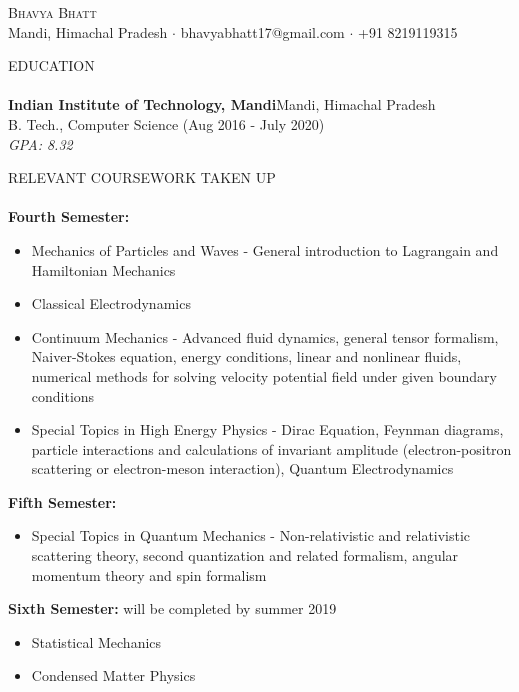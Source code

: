 \documentclass[a4paper]{article}
\newcommand{\lineunder} {
    \vspace*{-8pt} \\
    \hspace*{-18pt} \hrulefill \\
}
\newcommand{\header} [1] {
    {\hspace*{-18pt}\vspace*{6pt} \textsc{#1}}
    \vspace*{-6pt} \lineunder
}
\begin{document}
\vspace*{-40pt}

    

\vspace*{-10pt}
\begin{center}
    {\Huge \scshape {Bhavya Bhatt}}\\
    Mandi, Himachal Pradesh $\cdot$ bhavyabhatt17@gmail.com $\cdot$ +91 8219119315\\
\end{center}

\header{EDUCATION}
\textbf{Indian Institute of Technology, Mandi}\hfill Mandi, Himachal Pradesh\\
B. Tech., Computer Science (Aug 2016 - July 2020)\\
 \textit{GPA: 8.32}
\vspace{2mm}

\header{RELEVANT COURSEWORK TAKEN UP}
\textbf{Fourth Semester: }
\begin{itemize} \itemsep 1pt
    \item Mechanics of Particles and Waves - General introduction to Lagrangain and Hamiltonian Mechanics\\
    \item Classical Electrodynamics\\
    \item Continuum Mechanics - Advanced fluid dynamics, general tensor formalism, Naiver-Stokes equation, energy conditions, linear and nonlinear fluids, numerical methods for solving velocity potential field under given boundary conditions\\
    \item Special Topics in High Energy Physics - Dirac Equation, Feynman diagrams, particle interactions and calculations of invariant amplitude (electron-positron scattering or electron-meson interaction), Quantum Electrodynamics \\
\end{itemize}
\textbf{Fifth Semester: }
\begin{itemize} \itemsep 1pt
    \item Special Topics in Quantum Mechanics - Non-relativistic and relativistic scattering theory, second quantization and related formalism, angular momentum theory and spin formalism\\
\end{itemize}
\textbf{Sixth Semester: }\hfill *will be completed by summer 2019
\begin{itemize} \itemsep 1pt
    \item Statistical Mechanics\\
    \item Condensed Matter Physics\\
\end{itemize}
\vspace{2mm}
\end{document}
